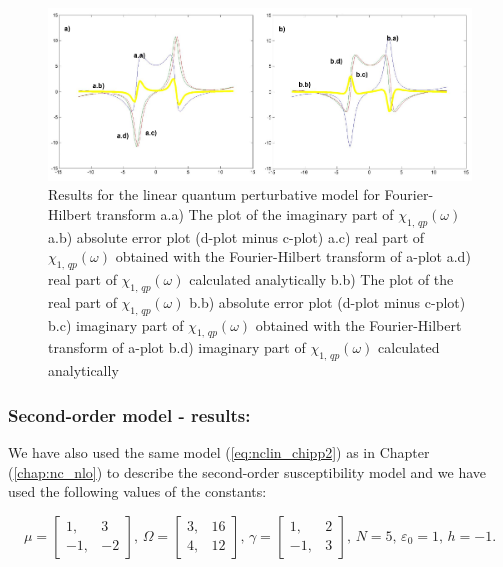 \documentclass[12pt,twoside,a4paper]{article}
\numberwithin{equation}{subsection}
\numberwithin{figure}{subsection}
\begin{document}
\begin{figure}
  \includegraphics[width=150mm]{img/four_qp1.png}
  \caption{Results for the linear quantum perturbative model for Fourier-Hilbert transform
    a.a) The plot of the imaginary part of ${\chi_{1, \, qp}}(\omega )$
    a.b) absolute error plot (d-plot minus c-plot) 
    a.c) real part of ${\chi_{1, \, qp}}(\omega )$ obtained with the Fourier-Hilbert transform of a-plot 
    a.d) real part of ${\chi_{1, \, qp}}(\omega )$ calculated analytically 
    b.b) The plot of the real part of ${\chi_{1, \, qp}}(\omega )$ 
    b.b) absolute error plot (d-plot minus c-plot) 
    b.c) imaginary part of ${\chi_{1, \, qp}}(\omega )$ obtained with the Fourier-Hilbert transform of a-plot 
    b.d) imaginary part of ${\chi_{1, \, qp}}(\omega )$ calculated analytically  
    \label{fig:four_qp1}
  }
\end{figure}

\subsubsection*{Second-order model - results:}

We have also used the same model (\ref{eq:nclin_chipp2}) as in Chapter (\ref{chap:nc_nlo}) to describe the second-order susceptibility
model and we have used the following values of the constants: 

\begin{equation}
	\mu = \begin{bmatrix} 
    	1,  & 3 \\ 
    	-1, & -2 
  	\end{bmatrix} , \, 
  	\Omega =  \begin{bmatrix}  
    	3, & 16 \\ 
    	4, & 12 
  	\end{bmatrix} , \,
  	\gamma =  \begin{bmatrix}  
  		1,  & 2 \\ 
  		-1, & 3
  	\end{bmatrix} , \, 
  	N = 5 , \, 
  	\varepsilon_0 = 1, \,
  	h = - 1 .
\end{equation}
\end{document}

